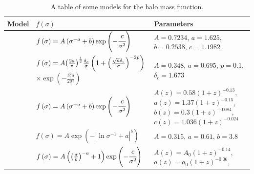 \begin{table}
    \centering
    \caption{A table of some models for the halo mass
    function.\label{tab:hmf}}
    \begin{tabular}{cp{6.5cm}p{5cm}}
        \toprule
        Model & $f \left(\sigma\right)$ & Parameters\\
        \midrule
        \citet{Warren+06} &
        $f\left(\sigma\right)=
        A\left(\sigma^{-a}+b\right)\exp\left(-\cfrac{c}{\sigma^2}\right)$ &
        $A=0.7234$, \newline
        $a=1.625$, \newline
        $b=0.2538$, \newline
        $c=1.1982$
        \\
        \citet{Courtin+11} &
        $f\left(\sigma\right)=
        A{\left(\frac{2a}{\pi}\right)}^{\frac{1}{2}}
        \frac{\delta_c}{\sigma}\left(1+
        {\left(\frac{\sqrt{a}\delta_c}{\sigma}\right)}^{-2p}\right)$\newline
        $\times\exp\left(-\frac{\delta_c^2{a}}{2\sigma^2}\right)$ &
        $A=0.348$, \newline
        $a=0.695$, \newline
        $p=0.1$, \newline
        $\delta_c=1.673$ \\
        \citet{Crocce+10} &
        $f\left(\sigma\right)=
        A\left(\sigma^{-a}+b\right)\exp\left(-\cfrac{c}{\sigma^2}\right)$ &
        $A\left(z\right)=0.58{\left(1+z\right)}^{-0.13}$,\newline
        $a\left(z\right)=1.37{\left(1+z\right)}^{-0.15}$,\newline
        $b\left(z\right)=0.3{\left(1+z\right)}^{-0.084}$,\newline
        $c\left(z\right)=1.036{\left(1+z\right)}^{-0.024}$
        \\
        \citet{Jenkins+01} &
        $f\left(\sigma\right)=
        A\exp\left(-\left|\ln\sigma^{-1}+a\right|^b\right)$ &
        $A=0.315$, \newline
        $a=0.61$, \newline
        $b=3.8$ \\
        \citet{Tinker+08} &
        $f\left(\sigma\right)=
        A\left({\left(\frac{\sigma}{b}\right)}^{-a}+1\right)
        \exp\left(-\cfrac{c}{\sigma^2}\right)$ &
        $A\left(z\right)=A_0{\left(1+z\right)}^{-0.14}$,\newline
        $a\left(z\right)=a_0{\left(1+z\right)}^{-0.06}$,\newline

\end{tabular}
\end{table}
